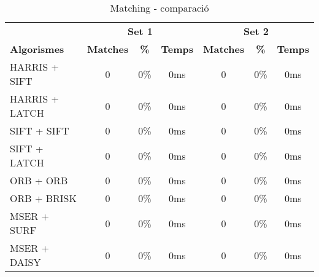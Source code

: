 	\begin{table}[H]
		\begin{center}
			\begin{tabular}{l | c c c | c c c}
				& \multicolumn{3}{c|}{\textbf{Set 1}} & \multicolumn{3}{c}{\textbf{Set 2}} \\
				\textbf{Algorismes} & \textbf{Matches} & \textbf{\%} & \textbf{Temps} & \textbf{Matches} & \textbf{\%} & \textbf{Temps} \\ \hline
				HARRIS + SIFT & 0 & 0\% & 0ms & 0 & 0\% & 0ms \\
				HARRIS + LATCH & 0 & 0\% & 0ms & 0 & 0\% & 0ms \\
				SIFT + SIFT & 0 & 0\% & 0ms & 0 & 0\% & 0ms \\
				SIFT + LATCH & 0 & 0\% & 0ms & 0 & 0\% & 0ms \\
				ORB + ORB & 0 & 0\% & 0ms & 0 & 0\% & 0ms \\
				ORB + BRISK & 0 & 0\% & 0ms & 0 & 0\% & 0ms \\
				MSER + SURF & 0 & 0\% & 0ms & 0 & 0\% & 0ms \\
				MSER + DAISY & 0 & 0\% & 0ms & 0 & 0\% & 0ms \\
			\end{tabular}
		\end{center}
		\caption{Matching - comparació}
	\end{table}

